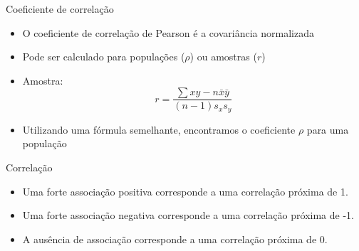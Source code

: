 \documentclass{beamer}
\begin{document}
\begin{frame}{Coeficiente de correlação}
  \begin{itemize}
  \item O coeficiente de correlação de Pearson é a covariância
    normalizada
  \item Pode ser calculado para populações ($\rho$) ou amostras ($r$)
  \item Amostra:
    \begin{displaymath}
      r = \frac{\sum xy - n \bar{x}\bar{y}}{(n-1)s_x s_y}
    \end{displaymath}
  \item Utilizando uma fórmula semelhante, encontramos o coeficiente
    $\rho$ para uma população
  \end{itemize}
\end{frame}

\begin{frame}{Correlação}
  \begin{block}{}
    \begin{itemize}
    \item Uma forte associação \alert<2>{positiva} corresponde a uma correlação
      próxima de \alert<2>{1}.
    \item Uma forte associação \alert<3>{negativa} corresponde a uma correlação
      próxima de \alert<3>{-1}.
    \item A \alert<4>{ausência} de associação corresponde a uma
      correlação próxima de \alert<4>{0}.
    \end{itemize}
  \end{block}
\end{frame}

\end{document}
